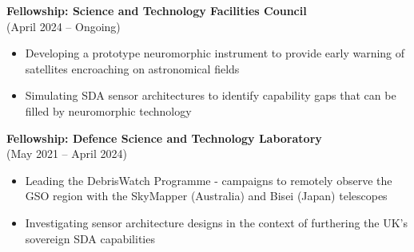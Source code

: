 \documentclass[10pt,a4paper]{altacv}
\begin{document}

\begin{fullwidth}
\makecvheader
\end{fullwidth}





\small \textbf{Fellowship: Science and Technology Facilities Council} \\ 
(April 2024 -- Ongoing)

\smallskip

\begin{itemize}
	\item Developing a prototype neuromorphic instrument to provide early warning of satellites encroaching on astronomical fields
	\item Simulating SDA sensor architectures to identify capability gaps that can be filled by neuromorphic technology
\end{itemize}

\smallskip

\small \textbf{Fellowship: Defence Science and Technology Laboratory} \\ 
(May 2021 -- April 2024)

\smallskip

\begin{itemize}
	\item Leading the DebrisWatch Programme - campaigns to remotely observe the GSO region with the SkyMapper (Australia) and Bisei (Japan) telescopes
	\item Investigating sensor architecture designs in the context of furthering the UK's sovereign SDA capabilities
\end{itemize}
\end{document}
